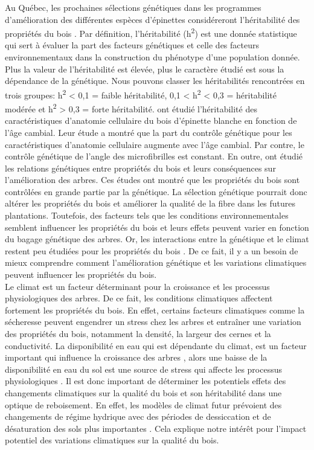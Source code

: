 \documentclass[a4paper,12pt]{report}
\begin{document}
Au Québec, les prochaines sélections génétiques dans les programmes d'amélioration des différentes espèces d'épinettes considéreront l'héritabilité des propriétés du bois \citep{Mullin2011, Beaulieu2009}. Par définition, l'héritabilité (h\textsuperscript{2}) est une donnée statistique qui sert à évaluer la part des facteurs génétiques et celle des facteurs environnementaux dans la construction du phénotype d'une population donnée. Plus la valeur de l'héritabilité est élevée, plus le caractère étudié est sous la dépendance de la génétique. Nous pouvons classer les héritabilités rencontrées en trois groupes: h\textsuperscript{2} < 0,1 = faible héritabilité, 0,1 < h\textsuperscript{2} < 0,3 = héritabilité modérée et h\textsuperscript{2} > 0,3 = forte héritabilité. \cite{Lenz2010} ont étudié l'héritabilité des caractéristiques d'anatomie cellulaire du bois d'épinette blanche en fonction de l'âge cambial. Leur étude a montré que la part du contrôle génétique pour les caractéristiques d'anatomie cellulaire augmente avec l'âge cambial. Par contre, le contrôle génétique de l'angle des microfibrilles est constant. En outre, \cite{Lenz2011} ont étudié les relations génétiques entre propriétés du bois et leurs conséquences sur l'amélioration des arbres. Ces études ont montré que les propriétés du bois sont contrôlées en grande partie par la génétique. La sélection génétique pourrait donc altérer les propriétés du bois et améliorer la qualité de la fibre dans les futures plantations. Toutefois, des facteurs tels que les conditions environnementales semblent influencer les propriétés du bois et leurs effets peuvent varier en fonction du bagage génétique des arbres. Or, les interactions entre la génétique et le climat restent peu étudiées pour les propriétés du bois \citep{Housset2018}. De ce fait, il y a un besoin de mieux comprendre comment l'amélioration génétique et les variations climatiques peuvent influencer les propriétés du bois. \\

Le climat est un facteur déterminant pour la croissance et les processus physiologiques des arbres. De ce fait, les conditions climatiques affectent fortement les propriétés du bois. En effet, certains facteurs climatiques comme la sécheresse peuvent engendrer un stress chez les arbres et entraîner une variation des propriétés du bois, notamment la densité, la largeur des cernes et la conductivité. La disponibilité en eau qui est dépendante du climat, est un facteur important qui influence la croissance des arbres \citep{Lebourgeois2005}, alors une baisse de la disponibilité en eau du sol est une source de stress qui affecte les processus physiologiques \citep{Waring1987}. Il est donc important de déterminer les potentiels effets des changements climatiques sur la qualité du bois et son héritabilité dans une optique de reboisement. En effet, les modèles de climat futur prévoient des changements de régime hydrique avec des périodes de dessiccation et de désaturation des sols plus importantes \citep{IPCC_2015}. Cela explique notre intérêt pour l'impact potentiel des variations climatiques sur la qualité du bois. \\
\end{document}
